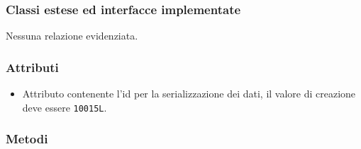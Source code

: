 \subsubsection*{Classi estese ed interfacce implementate}

Nessuna relazione evidenziata.

\subsubsection*{Attributi}

\begin{itemize}
	\item{}
	Attributo contenente l'id per la serializzazione dei dati, il valore di creazione deve essere \texttt{10015L}.
\end{itemize}

\subsubsection*{Metodi}

